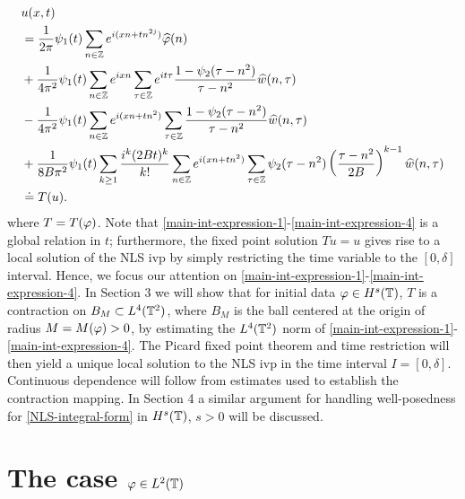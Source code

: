 \begin{align}
	\label{main-int-expression-1}
	& u(x, t) \notag
		\\
		& = \frac{1}{2 \pi} \psi_1(t) \sum_{n \in \mathbb{Z}} e^{i(xn + tn^{2 
		j})} \widehat{\varphi}(n) 
		\\
		\label{main-int-expression-2}
		& + \frac{1}{4 \pi^2} \psi_1(t) \sum_{n \in \mathbb{Z}} e^{ixn} \sum_{\tau \in \mathbb{Z}} 
		e^{it \tau} \frac{ 1 - \psi_2(\tau - n^2) 
		}{\tau - n^2} \widehat{w}(n, \tau) 
		\\
		\label{main-int-expression-3}
		& - \frac{1}{4 \pi^2} \psi_1(t) \sum_{n \in \mathbb{Z}} e^{i(xn + 
		tn^2)}
		\sum_{\tau \in \mathbb{Z}} \frac{1- \psi_2(\tau - n^2)}{\tau - n^2} \widehat{w}(n, \tau) 
		\\
		\label{main-int-expression-4}
		& + \frac{1}{8 B \pi^2} \psi_1(t) \sum_{k \ge 1} \frac{i^k (2Bt)^k}{k!}
		\sum_{n \in \mathbb{Z}} e^{i(xn + tn^2 )}
		\sum_{\tau \in \mathbb{Z}}	\psi_2 (\tau - n^2) \left(\frac{\tau - 
		n^2}{2B} \right)^{k -1} \widehat{w}(n, \tau) 
		\\
		& \doteq T(u). \notag
\end{align}
where $T = T(\varphi)$. Note that 
\eqref{main-int-expression-1}-\eqref{main-int-expression-4} is a global 
relation in $t$; furthermore, the fixed point solution $Tu=u$ gives rise to a 
local solution of the NLS ivp by simply restricting the time 
variable to 
the $[0, \delta]$ interval. Hence, we focus our attention on 
\eqref{main-int-expression-1}-\eqref{main-int-expression-4}. In 
Section 3 we will show that for initial data $\varphi \in H^s(\mathbb{T})$, $T$ is 
a contraction on $B_M 
\subset L^4(\mathbb{T}^2)$, where $B_M$ is the ball centered at 
the origin of radius $M = M(\varphi) > 0$, by estimating the $L^4(\mathbb{T}^2)$
norm of 
\eqref{main-int-expression-1}-\eqref{main-int-expression-4}. The Picard 
fixed point theorem and time restriction will
then yield a unique local solution to the NLS ivp in the time interval
$I = [0, \delta]$. Continuous 
dependence will follow from estimates used to establish the contraction 
mapping.  In Section 4 a similar argument for handling well-posedness for 
\eqref{NLS-integral-form} in $H^s(\mathbb{T})$, $s > 0$ will be discussed.
%
%
%
%
%
%
%
%
%
%
\section{The case $\varphi \in L^2(\mathbb{T})$}
\label{sec:s=0}
%
%
%
%
%
%
%
%
%
%
\vskip0.1in

